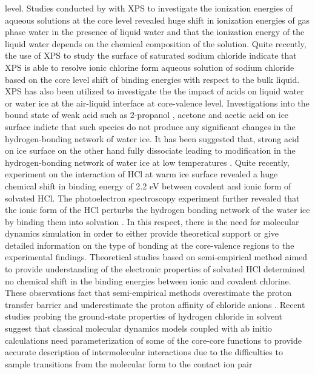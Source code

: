 \documentclass[a4paper,11pt]{report}
\begin{document}
level. Studies conducted by \citep{olivieri2016quantitative} with XPS to investigate the ionization energies of aqueous solutions at the core level revealed huge
shift in ionization energies of gas phase water in the presence of liquid water and that the ionization energy of the liquid water depends 
on the chemical composition of the solution. Quite recently, the use of XPS to study the surface of saturated
sodium chloride \citep{tissot2015cation,gaiduk2016photoelectron} indicate that XPS is able to resolve ionic chlorine form aqueous solution of sodium chloride based on the core level 
shift of binding energies with respect to the bulk liquid.
XPS has also been utilized to investigate the the impact of acids on liquid water or water ice at the air-liquid interface at core-valence level. 
Investigations into the bound state of weak acid such as 2-propanol \citep{newberg2015adsorption}, acetone \citep{starr2011acetone} and acetic
acid \citep{krepelova2013adsorption} on ice surface indicte that such species do not produce any significant changes in the hydrogen-bonding
network of water ice. It has been suggested that, strong acid on ice surface on the other hand fully dissociate leading to modification
in the hydrogen-bonding network of water ice at low temperatures \citep{parent2011hcl}. Quite recently, experiment on the 
interaction of HCl at warm ice surface revealed a huge chemical shift in binding energy of 2.2 eV between covalent and ionic form of 
solvated HCl. The photoelectron spectroscopy experiment further revealed that the ionic form of the HCl perturbs the 
hydrogen bonding network of the water ice by binding them into solvation \citep{kong2017coexistence}. In this respect, there is the need for
molecular dynamics simulation in order to either provide theoretical support or give detailed information on the type of bonding at the 
core-valence regions to the experimental findings. 
Theoretical studies based on semi-empirical method aimed to provide understanding of the electronic properties of solvated HCl  
determined no chemical shift in the binding energies between ionic and covalent chlorine. These observations 
fact that semi-empirical methods overestimate the proton transfer barrier and underestimate the proton affinity of chloride anions
\citep{arillo2007can}. Recent studies probing the ground-state properties of hydrogen chloride in solvent suggest that classical
molecular dynamics models coupled with ab initio calculations need parameterization of some of the core-core functions to provide accurate
description of intermolecular interactions due to the  difficulties to sample transitions from the molecular form to the contact ion pair 
\end{document}

